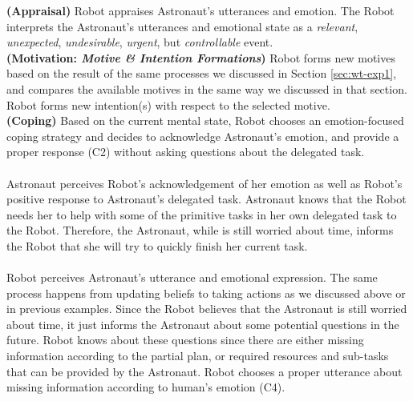 \noindent\textbf{(Appraisal)} Robot appraises Astronaut's utterances and
emotion. The Robot interprets the Astronaut's utterances and emotional state as
a \textit{relevant}, \textit{unexpected}, \textit{undesirable}, \textit{urgent},
but \textit{controllable} event.\\

\noindent\textbf{(Motivation: \textit{Motive \& Intention Formations})} Robot
forms new motives based on the result of the same processes we discussed in
Section \ref{sec:wt-exp1}, and compares the available motives in the same way
we discussed in that section. Robot forms new intention(s) with respect to the
selected motive.\\

\noindent\textbf{(Coping)} Based on the current mental state, Robot chooses an
emotion-focused coping strategy and decides to acknowledge Astronaut's emotion,
and provide a proper response (C2) without asking questions about the delegated
task.\\

\noindent{}\\

Astronaut perceives Robot's acknowledgement of her emotion as well as Robot's
positive response to Astronaut's delegated task. Astronaut knows that the
Robot needs her to help with some of the primitive tasks in her own delegated
task to the Robot. Therefore, the Astronaut, while is still worried about
time, informs the Robot that she will try to quickly finish her current task.\\

\noindent{}\\

Robot perceives Astronaut's utterance and emotional expression. The same process
happens from updating beliefs to taking actions as we discussed above or in
previous examples. Since the Robot believes that the Astronaut is still worried
about time, it just informs the Astronaut about some potential questions in the
future. Robot knows about these questions since there are either missing
information according to the partial plan, or required resources and sub-tasks
that can be provided by the Astronaut. Robot chooses a proper utterance about
missing information according to human's emotion (C4).\\

